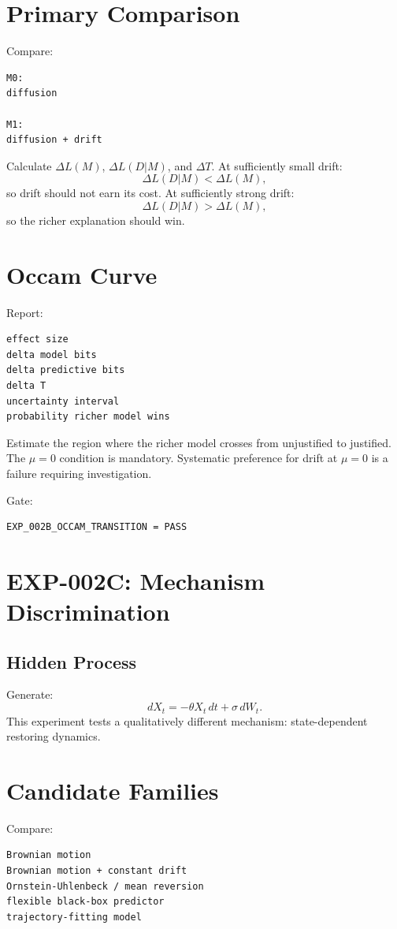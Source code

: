 \documentclass[11pt]{article}
\begin{document}
\section{Primary Comparison}

Compare:
\begin{verbatim}
M0:
diffusion

M1:
diffusion + drift
\end{verbatim}
Calculate \(\Delta L(M)\), \(\Delta L(D|M)\), and \(\Delta T\). At sufficiently small drift:
\[
\Delta L(D|M)<\Delta L(M),
\]
so drift should not earn its cost. At sufficiently strong drift:
\[
\Delta L(D|M)>\Delta L(M),
\]
so the richer explanation should win.

\section{Occam Curve}

Report:
\begin{verbatim}
effect size
delta model bits
delta predictive bits
delta T
uncertainty interval
probability richer model wins
\end{verbatim}
Estimate the region where the richer model crosses from unjustified to justified. The \(\mu=0\) condition is mandatory. Systematic preference for drift at \(\mu=0\) is a failure requiring investigation.

Gate:
\begin{verbatim}
EXP_002B_OCCAM_TRANSITION = PASS
\end{verbatim}

\section{EXP-002C: Mechanism Discrimination}

\subsection{Hidden Process}

Generate:
\[
dX_t=-\theta X_t\,dt+\sigma\,dW_t.
\]
This experiment tests a qualitatively different mechanism: state-dependent restoring dynamics.

\section{Candidate Families}

Compare:
\begin{verbatim}
Brownian motion
Brownian motion + constant drift
Ornstein-Uhlenbeck / mean reversion
flexible black-box predictor
trajectory-fitting model
\end{verbatim}
\end{document}
